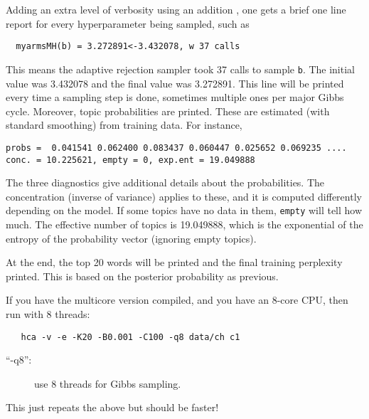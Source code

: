 \documentclass[a4paper,english]{article}
\begin{document}
Adding an extra level of verbosity using an addition , one gets
a brief one line report for every hyperparameter being sampled,
such as
\begin{verbatim}
  myarmsMH(b) = 3.272891<-3.432078, w 37 calls 
\end{verbatim}
This means the adaptive rejection sampler took 37 calls
to sample \texttt{b}.  The initial value was 3.432078
and the final value was 3.272891.
This line will be printed every time a sampling step is done, sometimes multiple
ones per major Gibbs cycle.
Moreover, topic probabilities are printed.
These are estimated (with standard smoothing) from
training data.  For instance,
\begin{verbatim}
probs =  0.041541 0.062400 0.083437 0.060447 0.025652 0.069235 ....
conc. = 10.225621, empty = 0, exp.ent = 19.049888
\end{verbatim}
The three diagnostics give additional details about the probabilities.
The concentration (inverse of variance) applies to these,
and it is computed differently depending on the model.
If some topics have no data in them, \texttt{empty} will tell how much.
The effective number of topics is 19.049888,
which is the exponential of the entropy of the probability vector
(ignoring empty topics).

At the end, the top 20 words will be printed and the
final training perplexity printed.  This is based on
the posterior probability as previous.

If you have the multicore version compiled, 
and you have an 8-core CPU, then run with 8 threads:
\begin{verbatim}
   hca -v -e -K20 -B0.001 -C100 -q8 data/ch c1
\end{verbatim}
\begin{description}
\item[``-q8'':] use 8 threads for Gibbs sampling.
\end{description}
This just repeats the above but should be faster!
\end{document}

